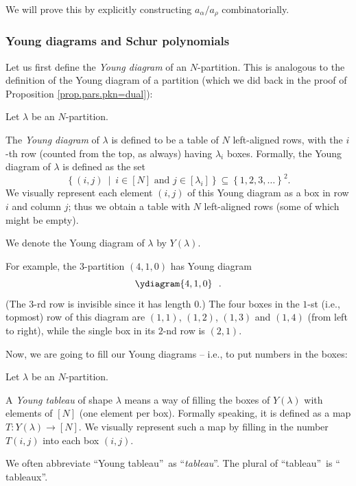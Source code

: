 We will prove this by explicitly constructing $a_{\alpha}/a_{\rho}$ combinatorially.

\subsubsection{Young diagrams and Schur polynomials}

Let us first define the \emph{Young diagram} of an $N$-partition. This is
analogous to the definition of the Young diagram of a partition (which we did
back in the proof of Proposition \ref{prop.pars.pkn=dual}):

\begin{definition}
\label{def.sf.ydiag}Let $\lambda$ be an $N$-partition.

The \emph{Young diagram} of $\lambda$ is defined to be a table of $N$
left-aligned rows, with the $i$-th row (counted from the top, as always)
having $\lambda_{i}$ boxes. Formally, the Young diagram of $\lambda$ is
defined as the set%
\[
\left\{  \left(  i,j\right)  \ \mid\ i\in\left[  N\right]  \text{ and }%
j\in\left[  \lambda_{i}\right]  \right\}  \subseteq\left\{  1,2,3,\ldots
\right\}  ^{2}.
\]
We visually represent each element $\left(  i,j\right)  $ of this Young
diagram as a box in row $i$ and column $j$; thus we obtain a table with $N$
left-aligned rows (some of which might be empty).

We denote the Young diagram of $\lambda$ by $Y\left(  \lambda\right)  $.
\end{definition}

For example, the $3$-partition $\left(  4,1,0\right)  $ has Young diagram%
\[
\ydiagram{4,1,0}\ \ .
\]
(The $3$-rd row is invisible since it has length $0$.) The four boxes in the
$1$-st (i.e., topmost) row of this diagram are $\left(  1,1\right)  $,
$\left(  1,2\right)  $, $\left(  1,3\right)  $ and $\left(  1,4\right)  $
(from left to right), while the single box in its $2$-nd row is $\left(
2,1\right)  $.

Now, we are going to fill our Young diagrams -- i.e., to put numbers in the boxes:

\begin{definition}
\label{def.sf.ytab}Let $\lambda$ be an $N$-partition.

A \emph{Young tableau} of shape $\lambda$ means a way of filling the boxes of
$Y\left(  \lambda\right)  $ with elements of $\left[  N\right]  $ (one element
per box). Formally speaking, it is defined as a map $T:Y\left(  \lambda
\right)  \rightarrow\left[  N\right]  $. We visually represent such a map by
filling in the number $T\left(  i,j\right)  $ into each box $\left(
i,j\right)  $.

We often abbreviate \textquotedblleft Young tableau\textquotedblright\ as
\textquotedblleft\emph{tableau}\textquotedblright. The plural of
\textquotedblleft tableau\textquotedblright\ is \textquotedblleft
tableaux\textquotedblright.
\end{definition}

